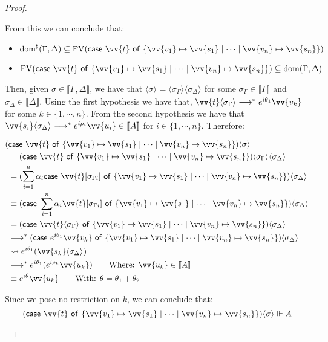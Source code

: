 \documentclass[runningheads,orivec,envcountsame,envcountsect]{llncs}
\newcommand\lra{\longrightarrow}
\newcommand\ansubst[2]{\ensuremath{\langle #1 \rangle_{#2}}}
\newcommand\dom[1]{\mathrm{dom}(#1)}
\newcommand\sdom[1]{\mathrm{dom}^{\sharp}(#1)}
\newcommand\FV[1]{\mathrm{FV}(#1)}
\def\gencase#1#2#3#4#5{\ensuremath{\mathsf{case}~#1~\mathsf{of}~\{#2\mapsto #4 \mid \dotsb \mid #3\mapsto #5\}}}
\def\lraneq{\rightsquigarrow}
\def\eval{\lra^*}
\def\sem#1{\llbracket#1\rrbracket}
\def\real{\Vdash}
\begin{document}
\begin{proof}
\begin{description}
    From this we can conclude that:
    
    \begin{itemize}
        \item $\sdom{\Gamma,\Delta}\subseteq \FV{\gencase{\vv{t}}{\vv{v_1}}{\vv {v_n}}{\vv{s_1}}{\vv{s_n}}}$
        \item $\FV{\gencase{\vv{t}}{\vv{v_1}}{\vv {v_n}}{\vv{s_1}}{\vv{s_n}}}\subseteq \dom{\Gamma,\Delta}$
    \end{itemize}


    
    Then, given $\sigma\in\sem{\Gamma,\Delta}$, we have that $\ansubst{\sigma}{}=\ansubst{\sigma_\Gamma}{}\ansubst{\sigma_\Delta}{}$ for some $\sigma_\Gamma\in\sem{\Gamma}$ and $\sigma_\Delta\in\sem{\Delta}$. Using the first hypothesis we have that, $\vv{t}\ansubst{\sigma_\Gamma}{}\eval e^{i\theta_1}\vv{v_k}$ for some $k\in\{1,\dotsb ,n\}$. From the second hypothesis we have that $\vv{s_i}\ansubst{\sigma_\Delta}{}\eval e^{i\rho_i}\vv{u_i}\in\sem{A}$ for $i\in\{1,\dotsb , n\}$. Therefore:

    \begin{align*}
        (&\gencase{\vv{t}}{\vv{v_1}}{\vv{v_n}}{\vv{s_1}}{\vv{s_n}})\ansubst{\sigma}{}\\ 
        &= (\gencase{\vv{t}}{\vv{v_1}}{\vv{v_n}}{\vv{s_1}}{\vv{s_n}})\ansubst{\sigma_\Gamma}{}\ansubst{\sigma_\Delta}{}\\
        &= (\sum_{i=1}^{n}\alpha_i \gencase{\vv{t}[\sigma_{\Gamma i}]}{\vv{v_1}}{\vv{v_n}}{\vv{s_1}}{\vv{s_n}})\ansubst{\sigma_\Delta}{} \\
        &\equiv (\gencase{\sum_{i=1}^{n} \alpha_i \vv{t}[\sigma_{\Gamma i}]}{\vv{v_1}}{\vv{v_n}}{\vv{s_1}}{\vv{s_n}})\ansubst{\sigma_\Delta}{}\\
        &=(\gencase{\vv{t}\ansubst{\sigma_\Gamma}{}}{\vv{v_1}}{\vv{v_n}}{\vv{s_1}}{\vv{s_n}})\ansubst{\sigma_\Delta}{}\\
        &\eval(\gencase{e^{i\theta_1}\vv{v_k}}{\vv{v_1}}{\vv{v_n}}{\vv{s_1}}{\vv{s_n}})\ansubst{\sigma_\Delta}{}\\
        &\lraneq e^{i\theta_1}(\vv{s_k}\ansubst{\sigma_\Delta}{})\\
        &\eval e^{i\theta_1}(e^{i\rho_k} \vv{u_k})\qquad\text{Where: }\vv{u_k}\in\sem{A}\\
        &\equiv e^{i\theta} \vv{u_k}\qquad\text{With: }\theta=\theta_1 +\theta_2
    \end{align*}
    
    Since we pose no restriction on $k$, we can conclude that:
    \[(\gencase{\vv{t}}{\vv{v_1}}{\vv{v_n}}{\vv{s_1}}{\vv{s_n}})\ansubst{\sigma}{}\real A\]



\end{description}
\end{proof}
\end{document}
